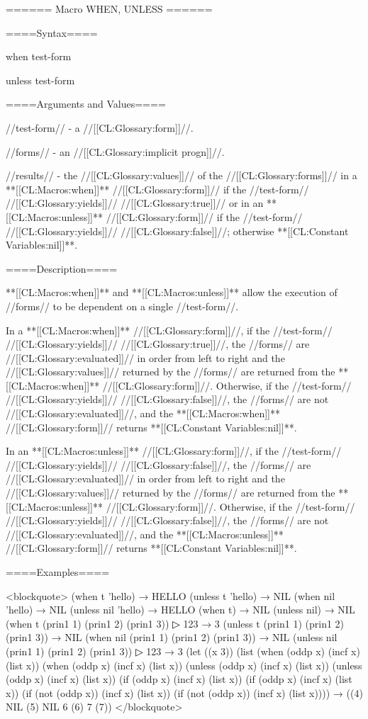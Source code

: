 ====== Macro WHEN, UNLESS ======

====Syntax====

\DefmacWithValues when {test-form } {}

\DefmacWithValues unless {test-form } {}

====Arguments and Values====

//test-form// - a //[[CL:Glossary:form]]//.

//forms// - an //[[CL:Glossary:implicit progn]]//.

//results// - the //[[CL:Glossary:values]]// of the //[[CL:Glossary:forms]]// in a **[[CL:Macros:when]]** //[[CL:Glossary:form]]// if the //test-form// //[[CL:Glossary:yields]]// //[[CL:Glossary:true]]// or in an **[[CL:Macros:unless]]** //[[CL:Glossary:form]]// if the //test-form// //[[CL:Glossary:yields]]// //[[CL:Glossary:false]]//; otherwise **[[CL:Constant Variables:nil]]**.

====Description====

**[[CL:Macros:when]]** and **[[CL:Macros:unless]]** allow the execution of //forms// to be dependent on a single //test-form//.

In a **[[CL:Macros:when]]** //[[CL:Glossary:form]]//, if the //test-form// //[[CL:Glossary:yields]]// //[[CL:Glossary:true]]//, the //forms// are //[[CL:Glossary:evaluated]]// in order from left to right and the //[[CL:Glossary:values]]// returned by the //forms// are returned from the **[[CL:Macros:when]]** //[[CL:Glossary:form]]//. Otherwise, if the //test-form// //[[CL:Glossary:yields]]// //[[CL:Glossary:false]]//, the //forms// are not //[[CL:Glossary:evaluated]]//, and the **[[CL:Macros:when]]** //[[CL:Glossary:form]]// returns **[[CL:Constant Variables:nil]]**.

In an **[[CL:Macros:unless]]** //[[CL:Glossary:form]]//, if the //test-form// //[[CL:Glossary:yields]]// //[[CL:Glossary:false]]//, the //forms// are //[[CL:Glossary:evaluated]]// in order from left to right and the //[[CL:Glossary:values]]// returned by the //forms// are returned from the **[[CL:Macros:unless]]** //[[CL:Glossary:form]]//. Otherwise, if the //test-form// //[[CL:Glossary:yields]]// //[[CL:Glossary:false]]//, the //forms// are not //[[CL:Glossary:evaluated]]//, and the **[[CL:Macros:unless]]** //[[CL:Glossary:form]]// returns **[[CL:Constant Variables:nil]]**.

====Examples====

<blockquote> (when t 'hello) → HELLO (unless t 'hello) → NIL (when nil 'hello) → NIL (unless nil 'hello) → HELLO (when t) → NIL (unless nil) → NIL (when t (prin1 1) (prin1 2) (prin1 3))
▷ 123 → 3 (unless t (prin1 1) (prin1 2) (prin1 3)) → NIL (when nil (prin1 1) (prin1 2) (prin1 3)) → NIL (unless nil (prin1 1) (prin1 2) (prin1 3))
▷ 123 → 3 (let ((x 3)) (list (when (oddp x) (incf x) (list x)) (when (oddp x) (incf x) (list x)) (unless (oddp x) (incf x) (list x)) (unless (oddp x) (incf x) (list x)) (if (oddp x) (incf x) (list x)) (if (oddp x) (incf x) (list x)) (if (not (oddp x)) (incf x) (list x)) (if (not (oddp x)) (incf x) (list x)))) → ((4) NIL (5) NIL 6 (6) 7 (7)) </blockquote>

